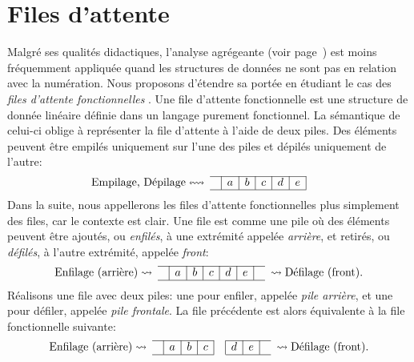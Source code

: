 \section{Files d'attente}
\label{sec:queueing}

Malgré ses qualités didactiques, l'analyse agrégeante (voir
page~\pageref{par:aggregate}) est moins fréquemment appliquée quand
les structures de données ne sont pas en relation avec la
numération. Nous proposons d'étendre sa portée en étudiant le cas des
\emph{files d'attente fonctionnelles}
\citep{Burton_1982,Okasaki_1995,Okasaki_1998b}. Une file d'attente
fonctionnelle est une structure de donnée linéaire définie dans un
langage purement fonctionnel. La sémantique de celui-ci oblige à
représenter la file d'attente à l'aide de deux piles. Des éléments
peuvent être empilés uniquement sur l'une des piles et dépilés
uniquement de l'autre:
\begin{equation*}
\begin{array}{@{}l@{}r@{\;}cc|c|c|c|c|c|cc@{\;}l@{}}
\cline{4-9}
& \text{Empilage, Dépilage}
& \leftrightsquigarrow & & a & b & c & d & e &&&\\
\cline{4-9}
\end{array}
\end{equation*}
Dans la suite, nous appellerons les files d'attente fonctionnelles
plus simplement des files, car le contexte est clair. Une file est
comme une pile où des éléments peuvent être ajoutés, ou
\emph{enfilés}, à une extrémité appelée \emph{arrière}, et retirés, ou
\emph{défilés}, à l'autre extrémité, appelée \emph{front}:
\begin{equation*}
\begin{array}{@{}l@{}r@{\;}cc|c|c|c|c|c|cc@{\;}l@{}}
\cline{4-10}
& \text{Enfilage (arrière)}
                & \rightsquigarrow & & a & b & c & d & e &
& \rightsquigarrow & \text{Défilage (front).}\\
\cline{4-10}
\end{array}
\end{equation*}
Réalisons une file avec deux piles: une pour enfiler, appelée
\emph{pile arrière}, et une pour défiler, appelée \emph{pile
  frontale}. La file précédente est alors équivalente à la
file fonctionnelle suivante:
\begin{equation*}
\begin{array}{r@{\;}cc|c|c|c|c|c|c|cc@{\;}l}
  \cline{3-6}\cline{8-10}
  \text{Enfilage (arrière)} & \rightsquigarrow & & a & b & c & & d & e & &
  \rightsquigarrow & \text{Défilage (front).}\\
  \cline{3-6}\cline{8-10}
\end{array}
\end{equation*}
